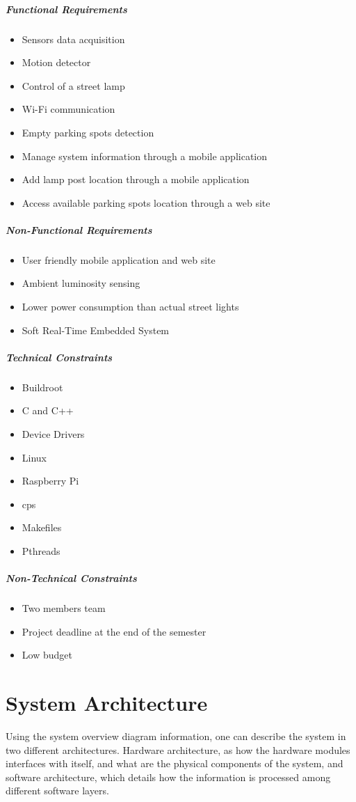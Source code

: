 \subparagraph{Functional Requirements}
\begin{itemize}
	\item Sensors data acquisition				
	\item Motion detector
	\item Control of a street lamp
	\item Wi-Fi communication
	\item Empty parking spots detection
	\item Manage system information through a mobile application
	\item Add lamp post location through a mobile application
	\item Access available parking spots location through a web site
\end{itemize}

\subparagraph{Non-Functional Requirements}
\begin{itemize}
	\item User friendly mobile application and web site
	\item Ambient luminosity sensing
	\item Lower power consumption than actual street lights
	\item Soft Real-Time Embedded System
\end{itemize}

\subparagraph{Technical Constraints}
\begin{itemize}
	\item Buildroot
	\item C and C++ 
	\item Device Drivers
	\item Linux
	\item Raspberry Pi
	\item \ac{cps}
	\item Makefiles
	\item Pthreads
\end{itemize}

\subparagraph{Non-Technical Constraints}
\begin{itemize}
	\item Two members team
	\item Project deadline at the end of the semester
	\item Low budget
\end{itemize}

\section{System Architecture}
Using the system overview diagram information, one can describe the system in two different architectures. Hardware architecture, as how the hardware modules interfaces with itself, and what are the physical components of the system, and software architecture, which details how the information is processed among different software layers.

